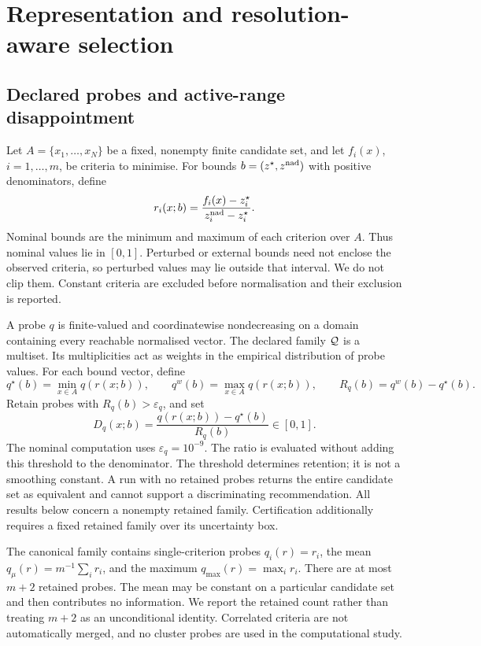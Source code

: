 \section{Representation and resolution-aware selection}
\label{sec:relextail}
\subsection{Declared probes and active-range disappointment}
Let $A=\{x_1,\ldots,x_N\}$ be a fixed, nonempty finite candidate set, and let $f_i(x)$, $i=1,\ldots,m$, be criteria to minimise. For bounds $b=(z^\star,z^{\mathrm{nad}})$ with positive denominators, define
\begin{equation}
r_i(x;b)=\frac{f_i(x)-z^\star_i}{z^{\mathrm{nad}}_i-z^\star_i}.
\label{eq:norm}
\end{equation}
Nominal bounds are the minimum and maximum of each criterion over $A$. Thus nominal values lie in $[0,1]$. Perturbed or external bounds need not enclose the observed criteria, so perturbed values may lie outside that interval. We do not clip them. Constant criteria are excluded before normalisation and their exclusion is reported.

A probe $q$ is finite-valued and coordinatewise nondecreasing on a domain containing every reachable normalised vector. The declared family $\mathcal Q$ is a multiset. Its multiplicities act as weights in the empirical distribution of probe values. For each bound vector, define
\[
q^\star(b)=\min_{x\in A}q(r(x;b)),\qquad q^w(b)=\max_{x\in A}q(r(x;b)),\qquad R_q(b)=q^w(b)-q^\star(b).
\]
Retain probes with $R_q(b)>\varepsilon_q$, and set
\begin{equation}
D_q(x;b)=\frac{q(r(x;b))-q^\star(b)}{R_q(b)}\in[0,1].
\label{eq:disap}
\end{equation}
The nominal computation uses $\varepsilon_q=10^{-9}$. The ratio is evaluated without adding this threshold to the denominator. The threshold determines retention; it is not a smoothing constant. A run with no retained probes returns the entire candidate set as equivalent and cannot support a discriminating recommendation. All results below concern a nonempty retained family. Certification additionally requires a fixed retained family over its uncertainty box.

The canonical family contains single-criterion probes $q_i(r)=r_i$, the mean $q_\mu(r)=m^{-1}\sum_i r_i$, and the maximum $q_{\max}(r)=\max_i r_i$. There are at most $m+2$ retained probes. The mean may be constant on a particular candidate set and then contributes no information. We report the retained count rather than treating $m+2$ as an unconditional identity. Correlated criteria are not automatically merged, and no cluster probes are used in the computational study.

